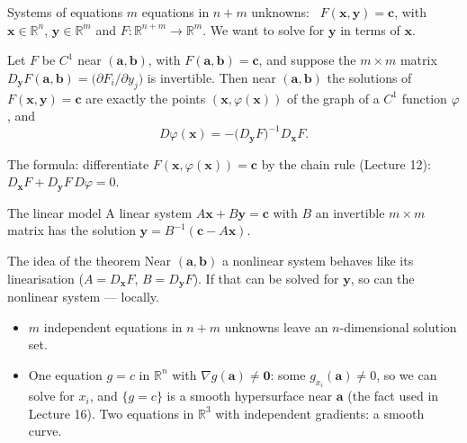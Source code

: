 \documentclass[10pt]{wosm-slides}
\newcommand{\R}{\mathbb{R}}
\newcommand{\vx}{\mathbf{x}}
\newcommand{\vy}{\mathbf{y}}
\newcommand{\va}{\mathbf{a}}
\newcommand{\vb}{\mathbf{b}}
\newcommand{\vc}{\mathbf{c}}
\begin{document}
\begin{frame}{Systems of equations}
  $m$ equations in $n + m$ unknowns: \ $F(\vx, \vy) = \vc$, with $\vx \in \R^n$, $\vy \in \R^m$ and
  $F\colon \R^{n+m} \to \R^m$. We want to solve for $\vy$ in terms of $\vx$.
  \pause
  \begin{theorem}
    Let $F$ be $C^1$ near $(\va, \vb)$, with $F(\va, \vb) = \vc$, and suppose the $m \times m$ matrix
    $D_{\vy}F(\va, \vb) = \bigl(\partial F_i / \partial y_j\bigr)$ is invertible. Then near $(\va, \vb)$
    the solutions of $F(\vx, \vy) = \vc$ are exactly the points $(\vx, \varphi(\vx))$ of the graph of a
    $C^1$ function $\varphi$, and
    \[ D\varphi(\vx) = -\bigl(D_{\vy}F\bigr)^{-1} D_{\vx}F . \]
  \end{theorem}
  \pause
  {\small The formula: differentiate $F(\vx, \varphi(\vx)) = \vc$ by the chain rule (Lecture 12):
  $D_{\vx}F + D_{\vy}F\, D\varphi = 0$.\par}
\end{frame}

\begin{frame}{The linear model}
  A linear system $A\vx + B\vy = \vc$ with $B$ an invertible $m \times m$ matrix has the solution
  $\vy = B^{-1}(\vc - A\vx)$.
  \pause
  \begin{block}{The idea of the theorem}
    Near $(\va, \vb)$ a nonlinear system behaves like its linearisation ($A = D_{\vx}F$,
    $B = D_{\vy}F$). If that can be solved for $\vy$, so can the nonlinear system --- locally.
  \end{block}
  \pause
  \begin{itemize}
    \item $m$ independent equations in $n + m$ unknowns leave an $n$-dimensional solution set.
    \item One equation $g = c$ in $\R^n$ with $\nabla g(\va) \ne \mathbf 0$: some $g_{x_i}(\va) \ne 0$, so we
      can solve for $x_i$, and $\{g = c\}$ is a smooth hypersurface near $\va$ (the fact used in
      Lecture 16). Two equations in $\R^3$ with independent gradients: a smooth curve.
  \end{itemize}
\end{frame}
\end{document}
